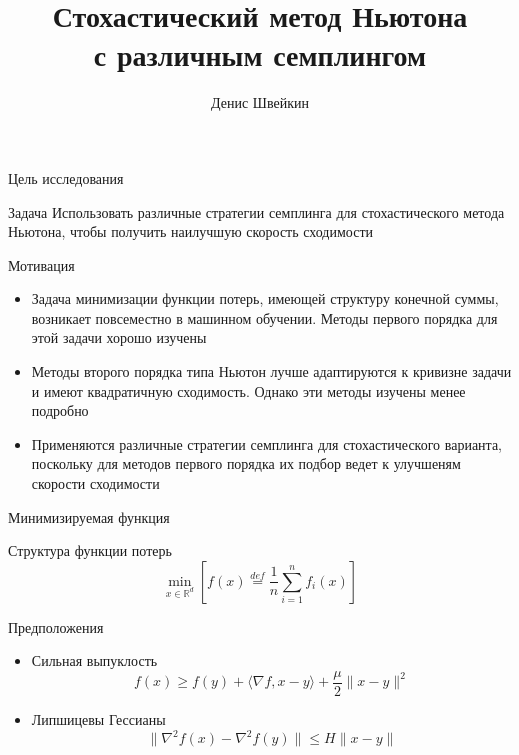 \documentclass{beamer}
\title[\hbox to 56mm{Стохастический метод Ньютона}]{Стохастический метод Ньютона \\ с различным семплингом}
\author{Денис Швейкин}
\institute{Московский физико-технический институт}
\date{\footnotesize
\par\smallskip\emph{Курс:} Моя первая научная статья
\par\smallskip\emph{Эксперт:} Рустем Исламов
\par\bigskip\small 2023}
\begin{document}
\begin{frame}
\thispagestyle{empty}
\maketitle
\end{frame}
\begin{frame}{Цель исследования}
	
\begin{block}{Задача}
	Использовать различные стратегии семплинга для стохастического метода Ньютона, чтобы получить наилучшую скорость сходимости
\end{block}

\begin{block}{Мотивация}
	\begin{itemize}
		\item Задача минимизации функции потерь, имеющей структуру конечной суммы, возникает повсеместно в машинном обучении. Методы первого порядка для этой задачи хорошо изучены
		\item Методы второго порядка типа Ньютон лучше адаптируются к кривизне задачи и имеют квадратичную сходимость. Однако эти методы изучены менее подробно
		\item Применяются различные стратегии семплинга для стохастического варианта, поскольку для методов первого порядка их подбор ведет к улучшеням скорости сходимости
	\end{itemize}
\end{block}

\end{frame}
\begin{frame}{Минимизируемая функция}


	\begin{block}{Структура функции потерь}
	$$\underset{x \in \mathbb R^d}{\min} \left[ f(x) \overset{def}{=} \frac{1}{n} \sum \limits_{i=1}^n f_i(x) \right]$$
	\end{block}

	\begin{block}{Предположения}
	\begin{itemize}
   	\item Сильная выпуклость
   	$$f(x) \geqslant f(y) + \langle \nabla f, x - y \rangle + \frac{\mu}{2} \| x - y \|^2$$
   	\item Липшицевы Гессианы
   	$$\| \nabla^2 f(x) - \nabla^2 f(y) \| \leqslant H \| x - y \|$$
	\end{itemize}
\end{block}

\bigskip

\end{frame}
\end{document}
